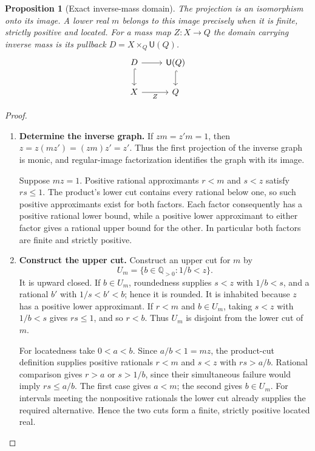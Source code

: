 \documentclass[11pt,a4paper]{article}
\newtheorem{proposition}[proposition]{Proposition}
\theoremstyle{definition}
\theoremstyle{remark}\newaliascnt{remark}{theorem}
\numberwithin{equation}{section}
\begin{document}
\begin{proposition}[Exact inverse-mass domain]\label{prop:normalization-unit-domain}
The projection is an isomorphism onto its image. A lower real \(m\) belongs to this image precisely when it is finite, strictly positive and located. For a mass map \(Z:X\to Q\) the domain carrying inverse mass is its pullback \(D=X\times_Q\mathsf U(Q)\).
\[
\begin{tikzcd}
 D\arrow[r]\arrow[d,hook]&\mathsf U(Q)\arrow[d,hook]\\
 X\arrow[r,"Z"']&Q
\end{tikzcd}
\]
\end{proposition}
\begin{proof}\leavevmode
\begin{enumerate}[titledsteps]
    \item \textbf{Determine the inverse graph.} If $zm=z'm=1$, then $z=z(mz')=(zm)z'=z'$. Thus the first projection of the inverse graph is monic, and regular-image factorization identifies the graph with its image.

Suppose $mz=1$. Positive rational approximants $r<m$ and $s<z$ satisfy $rs\le1$. The product's lower cut contains every rational below one, so such positive approximants exist for both factors. Each factor consequently has a positive rational lower bound, while a positive lower approximant to either factor gives a rational upper bound for the other. In particular both factors are finite and strictly positive.


    \item \textbf{Construct the upper cut.} Construct an upper cut for $m$ by
\[
 U_m=\{b\in\mathbb Q_{>0}:1/b<z\}.
\]
It is upward closed. If $b\in U_m$, roundedness supplies $s<z$ with $1/b<s$, and a rational $b'$ with $1/s<b'<b$; hence it is rounded. It is inhabited because $z$ has a positive lower approximant. If $r<m$ and $b\in U_m$, taking $s<z$ with $1/b<s$ gives $rs\le1$, and so $r<b$. Thus $U_m$ is disjoint from the lower cut of $m$.

For locatedness take $0<a<b$. Since $a/b<1=mz$, the product-cut definition supplies positive rationals $r<m$ and $s<z$ with $rs>a/b$. Rational comparison gives $r>a$ or $s>1/b$, since their simultaneous failure would imply $rs\le a/b$. The first case gives $a<m$; the second gives $b\in U_m$. For intervals meeting the nonpositive rationals the lower cut already supplies the required alternative. Hence the two cuts form a finite, strictly positive located real.



\end{enumerate}
\end{proof}
\end{document}
